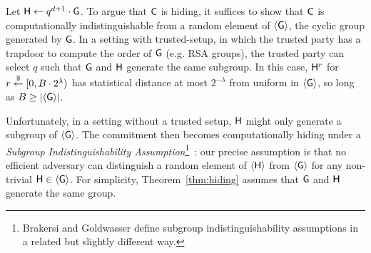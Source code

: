 Let $\gr{h} \leftarrow q^{d+1}\cdot \gr{g}$. 
To argue that $\gr{C}$ is hiding, it suffices to show that $\gr{C}$ is computationally indistinguishable from a random element of $\langle \gr{g}\rangle$, the cyclic group generated by $\gr{g}$. In a setting with trusted-setup, in which the trusted party has a trapdoor to compute the order of $\gr{g}$ (e.g. RSA groups), the trusted party can select $q$ such that $\gr{g}$ and $\gr{h}$ generate the same subgroup. In this case, $\gr{h}^r$ for $r \overset{\$}{\gets} [0, B\cdot 2^\lambda)$ has statistical distance at most $2^{-\lambda}$ from uniform in $\langle \gr{g} \rangle$, so long as $B \geq |\langle \gr{g} \rangle|$. 


Unfortunately, in a setting without a trusted setup, $\gr{h}$ might only generate a subgroup of $\langle \gr{g} \rangle$. The commitment then becomes computationally hiding under a \emph{Subgroup Indistinguishability Assumption}\footnote{Brakersi and Goldwasser define subgroup indistinguishability assumptions in a related but slightly different way.}~\cite{C:BraGol10}: our precise assumption is that no efficient adversary can distinguish a random element of $\langle \gr{h} \rangle$ from $\langle \gr{g} \rangle$ for any non-trivial $\gr{h} \in \langle \gr{g} \rangle$. %
For simplicity, Theorem~\ref{thm:hiding} assumes that $\gr{g}$ and $\gr{h}$ generate the same group. 

